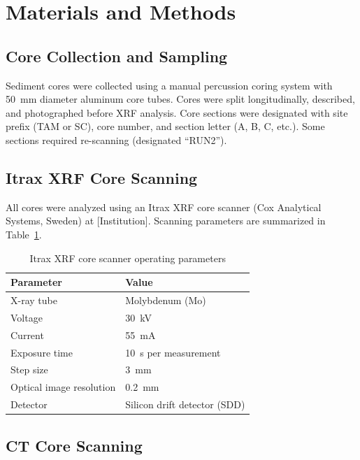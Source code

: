 \documentclass[11pt,a4paper]{article}
\begin{document}
\section{Materials and Methods}

\subsection{Core Collection and Sampling}

Sediment cores were collected using a manual percussion coring system with 50~mm diameter aluminum core tubes. Cores were split longitudinally, described, and photographed before XRF analysis. Core sections were designated with site prefix (TAM or SC), core number, and section letter (A, B, C, etc.). Some sections required re-scanning (designated ``RUN2'').

\subsection{Itrax XRF Core Scanning}

All cores were analyzed using an Itrax XRF core scanner (Cox Analytical Systems, Sweden) at [Institution]. Scanning parameters are summarized in Table~\ref{tab:scan_params}.

\begin{table}[h]
\centering
\caption{Itrax XRF core scanner operating parameters}
\label{tab:scan_params}
\begin{tabular}{ll}
\toprule
Parameter & Value \\
\midrule
X-ray tube & Molybdenum (Mo) \\
Voltage & \SI{30}{kV} \\
Current & \SI{55}{mA} \\
Exposure time & \SI{10}{s} per measurement \\
Step size & \SI{3}{mm} \\
Optical image resolution & \SI{0.2}{mm} \\
Detector & Silicon drift detector (SDD) \\
\bottomrule
\end{tabular}
\end{table}

\subsection{CT Core Scanning}
\end{document}
